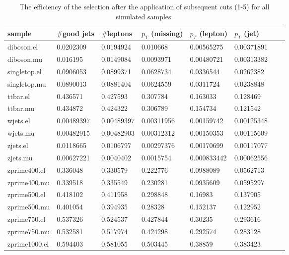   \begin{table}[H]
    \centering
    \caption{The efficiency of the selection after the application of subsequent cuts (1-5) for all simulated samples.}
    \begin{tabular}{l|lllllll}
    sample             & $\#$good jets & $\#$leptons & $p_T$ (missing) &  $p_T$ (lepton)    & $p_T$ (jet)   \\
    \hline
      diboson.el    & 0.0202309  & 0.0194924  & 0.010668   & 0.00565275  & 0.00371891  \\
      diboson.mu    & 0.016195   & 0.0149084  & 0.0093971  & 0.00480721  & 0.00313382  \\
      singletop.el  & 0.0906053  & 0.0899371  & 0.0628734  & 0.0336544   & 0.0262382   \\
      singletop.mu  & 0.0890013  & 0.0881404  & 0.0624559  & 0.0311724   & 0.0238848   \\
      ttbar.el      & 0.436571   & 0.427593   & 0.307784   & 0.163033    & 0.128469    \\
      ttbar.mu      & 0.434872   & 0.424322   & 0.306789   & 0.154734    & 0.121542    \\
      wjets.el      & 0.00489397 & 0.00489397 & 0.00311956 & 0.00159742  & 0.00125348  \\
      wjets.mu      & 0.00482915 & 0.00482903 & 0.00312312 & 0.00150353  & 0.00115609  \\
      zjets.el      & 0.0118665  & 0.0106797  & 0.00297376 & 0.00170699  & 0.00117077  \\
      zjets.mu      & 0.00627221 & 0.0040402  & 0.0015754  & 0.000833442 & 0.00062556  \\
      zprime400.el  & 0.336048   & 0.330579   & 0.222776   & 0.0988089   & 0.0562713   \\
      zprime400.mu  & 0.339518   & 0.335549   & 0.230281   & 0.0935609   & 0.0595297   \\
      zprime500.el  & 0.418102   & 0.411958   & 0.298848   & 0.16983     & 0.137905    \\
      zprime500.mu  & 0.401054   & 0.394935   & 0.28328    & 0.152137    & 0.122952    \\
      zprime750.el  & 0.537326   & 0.524537   & 0.427844   & 0.30235     & 0.293616    \\
      zprime750.mu  & 0.532581   & 0.517974   & 0.424298   & 0.292574    & 0.283128    \\
      zprime1000.el & 0.594403   & 0.581055   & 0.503445   & 0.38859     & 0.383423    \\

\end{tabular}
\end{table}
